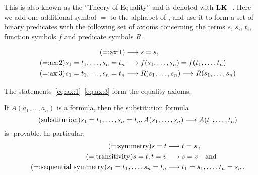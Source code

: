\documentclass[11pt,a4paper]{article}
\begin{document}
This is also known as the ''Theory of Equality'' and is denoted with \(\textbf{LK}_=\).
Here we add one additional symbol \(=\) to the alphabet of \LK{},
and use it to form a set of binary predicates with the following set
of axioms concerning the terms \(s\), \(s_i\), \(t_i\),
function symbols \(f\) and predicate symbols \(R\).
\begin{axiom}\label{axi:equality}
\begin{align}
\tag{=:ax:1}\label{eq:ax:1}
    &\longrightarrow s = s, \\
\tag{=:ax:2}\label{eq:ax:2}
    s_1 = t_1,\ldots,s_n = t_n &\longrightarrow f(s_1,\ldots,s_n) = f(t_1,\ldots,t_n) \\
\tag{=:ax:3}\label{eq:ax:3}
    s_1 = t_1,\ldots,s_n = t_n &\longrightarrow R(s_1,\ldots,s_n)\longrightarrow R(s_1,\ldots,s_n)
\end{align}
\end{axiom}
The statements~\eqref{eq:ax:1}--\eqref{eq:ax:3} form the equality axioms.

\begin{proposition}[7.2]\label{prop:7.2}
    If \(A(a_1,\ldots,a_n)\) is a formula,
    then the substitution formula
    \begin{equation}\tag{substitution}\label{eq:substitution}
        s_1 = t_1,\ldots,s_n=t_n,A(s_1,\ldots,s_n)\longrightarrow A(t_1,\ldots,t_n)
    \end{equation}
    is \LK-provable. In particular:
    \begin{align}
        \tag{=:symmetry}\label{eq:symmetry}
            s=t&\longrightarrow t=s\,,\\
        \tag{=:transitivity}\label{eq:transitivity}
            s=t,t=v&\longrightarrow s=v\quad\text{and} \\
        \tag{=:sequential symmetry}\label{eq:sequential symmetry}
            s_1 = t_1,\ldots,s_n = t_n&\longrightarrow t_1 = s_1, \ldots, t_n = s_n\,.
    \end{align}
\end{proposition}
\end{document}
